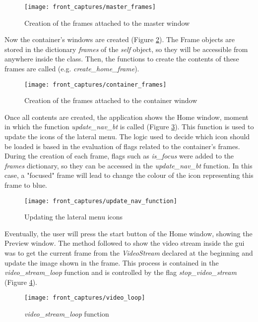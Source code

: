\begin{figure}[!ht]
	\centering
	\texttt{[image: front\_captures/master\_frames]}
	\caption{Creation of the frames attached to the master window}
	\label{fig:master_frames}
\end{figure}

Now the container's windows are created (Figure \ref{fig:container_frames}). The Frame objects are stored in the dictionary \textit{frames} of the \textit{self} object, so they will be accessible from anywhere inside the class. Then, the functions to create the contents of these frames are called (e.g. \textit{create{\_}home{\_}frame}).

\begin{figure}[!ht]
	\centering
	\texttt{[image: front\_captures/container\_frames]}
	\caption{Creation of the frames attached to the container window}
	\label{fig:container_frames}
\end{figure}

Once all contents are created, the application shows the Home window, moment in which the function \textit{update{\_}nav{\_}bt} is called (Figure \ref{fig:update_nav_function}). This function is used to update the icons of the lateral menu. The logic used to decide which icon should be loaded is based in the evaluation of flags related to the container's frames. During the creation of each frame, flags such as \textit{is{\_}focus} were added to the \textit{frames} dictionary, so they can be accessed in the \textit{update{\_}nav{\_}bt} function. In this case, a "focused" frame will lead to change the colour of the icon representing this frame to blue. 

\begin{figure}[!ht]
	\centering
	\texttt{[image: front\_captures/update\_nav\_function]}
	\caption{Updating the lateral menu icons}
	\label{fig:update_nav_function}
\end{figure}

Eventually, the user will press the start button of the Home window, showing the Preview window. The method followed to show the video stream inside the \gls{gui} was to get the current frame from the \textit{VideoStream} declared at the beginning and update the image shown in the frame. This process is contained in the \textit{video{\_}stream{\_}loop} function and is controlled by the flag \textit{stop{\_}video{\_}stream} (Figure \ref{fig:video_loop_function}).  

\begin{figure}[!ht]
	\centering
	\texttt{[image: front\_captures/video\_loop]}
	\caption{\textit{video{\_}stream{\_}loop} function}
	\label{fig:video_loop_function}
\end{figure}


